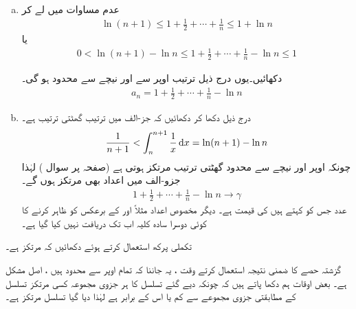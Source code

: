 \begin{enumerate}[a.]
\item
عدم مساوات  میں  لے کر 
\begin{align*}
\ln (n+1)\le 1+\frac{1}{2}+\cdots+\frac{1}{n}\le 1+\ln n
\end{align*}
یا 
\begin{align*}
0<\ln (n+1)-\ln n\le 1+\frac{1}{2}+\cdots+\frac{1}{n}-\ln n\le 1
\end{align*}

دکھائیں۔یوں درج ذیل ترتیب اوپر سے اور نیچے سے محدود ہو گی۔
\begin{align*}
a_n=1+\frac{1}{2}+\cdots+\frac{1}{n}-\ln n
\end{align*}
\item
درج ذیل دکھا کر دکھائیں کہ جز-الف میں ترتیب  گھٹتی ترتیب ہے۔
\begin{align*}
\frac{1}{n+1}<\int_n^{n+1}\frac{1}{x}\dif x=\ln (n+1)-\ln n
\end{align*} 
چونکہ اوپر اور نیچے سے محدود گھٹتی ترتیب مرتکز ہوتی ہے (صفحہ  پر سوال )   لہٰذا جزو-الف میں اعداد  بھی مرتکز ہوں گے۔
\begin{align*}
1+\frac{1}{2}+\cdots+\frac{1}{n}-\ln n\to \gamma
\end{align*}
عدد  جس کو  کہتے ہیں کی قیمت  ہے۔ دیگر مخصوص اعداد مثلاً  اور  کے برعکس  کو ظاہر کرنے کا کوئی دوسرا  سادہ کلیہ اب تک دریافت نہیں کیا گیا ہے۔
\end{enumerate}
تکملی پرکھ استعمال کرتے ہوئے دکھائیں کہ  مرتکز ہے۔

گزشتہ حصے  کا  ضمنی نتیجہ   استعمال کرتے وقت ، یہ جاننا کہ   تمام  اوپر سے محدود ہیں ، اصل مشکل ہے۔ بعض اوقات ہم دکھا پاتے ہیں کہ چونکہ دیے گئے تسلسل کا ہر جزوی مجموعہ  کسی مرتکز تسلسل کے  مطابقتی جزوی مجموعے سے کم یا اس کے برابر  ہے لہٰذا دیا گیا تسلسل مرتکز ہے۔ 

